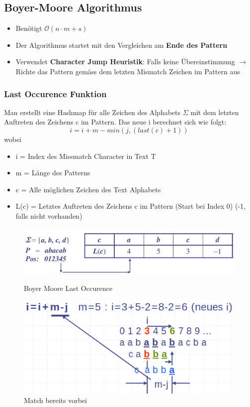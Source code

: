 \subsection{Boyer-Moore Algorithmus}
\begin{itemize}
	\item Benötigt $\mathcal{O}(n\cdot m + s)$
	\item Der Algorithmus startet mit den Vergleichen am \textbf{Ende des Pattern}
	\item Verwendet \textbf{Character Jump Heuristik}: Falls keine Übereinstimmung $\rightarrow$ Richte das Pattern gemäss dem letzten Mismatch Zeichen im Pattern aus
\end{itemize}

\subsubsection{Last Occurence Funktion}
Man erstellt eine Hashmap für alle Zeichen des Alphabets $\Sigma$ mit dem letzten Auftreten des Zeichens c im Pattern. Das neue i berechnet sich wie folgt:
\[
	i = i + m - min(j, (last(c) + 1))
\]
wobei
\begin{itemize}[label=]
	\item i = Index des Missmatch Character in Text T
	\item m = Länge des Patterns
	\item c = Alle möglichen Zeichen des Text Alphabets
	\item L(c) = Letztes Auftreten des Zeichens c im Pattern (Start bei Index 0) (-1, falls nicht vorhanden)
\end{itemize}

\begin{figure}[h!]
	\centering
	\begin{minipage}[t]{1\textwidth}
		\centering
		\includegraphics[width=0.7\linewidth]{images/boyer_moore_last_occurence}
		\caption{Boyer Moore Last Occurence}
		\label{fig:mergesortalg}
	\end{minipage}
	\begin{minipage}[t]{1\textwidth}
		\centering
		\includegraphics[width=0.9\linewidth]{images/lastoccurencevorbei}
		\caption{Match bereits vorbei}
		\label{fig:mergesortmergen}
	\end{minipage}
\end{figure}

